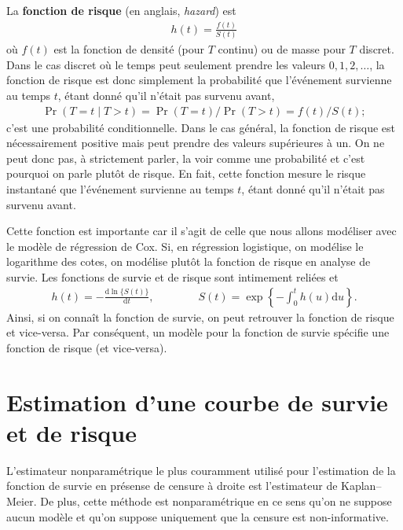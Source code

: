 \documentclass[
  11pt,
  letterpaper,
]{book}
\theoremstyle{definition}
\theoremstyle{remark}
\begin{document}
La \textbf{fonction de risque} (en anglais, \emph{hazard}) est
\begin{align*}
h(t) =  \frac{f(t)}{S(t)}
\end{align*} où \(f(t)\) est la fonction de densité (pour \(T\) continu)
ou de masse pour \(T\) discret. Dans le cas discret où le temps peut
seulement prendre les valeurs \(0, 1, 2, \ldots\), la fonction de risque
est donc simplement la probabilité que l'événement survienne au temps
\(t\), étant donné qu'il n'était pas survenu avant, \begin{align*}
\Pr(T=t \mid T > t) = \Pr(T=t) / \Pr(T >t) = f(t)/S(t);
\end{align*} c'est une probabilité conditionnelle. Dans le cas général,
la fonction de risque est nécessairement positive mais peut prendre des
valeurs supérieures à un. On ne peut donc pas, à strictement parler, la
voir comme une probabilité et c'est pourquoi on parle plutôt de risque.
En fait, cette fonction mesure le risque instantané que l'événement
survienne au temps \(t\), étant donné qu'il n'était pas survenu avant.

Cette fonction est importante car il s'agit de celle que nous allons
modéliser avec le modèle de régression de Cox. Si, en régression
logistique, on modélise le logarithme des cotes, on modélise plutôt la
fonction de risque en analyse de survie. Les fonctions de survie et de
risque sont intimement reliées et \begin{align*}
h(t) = - \frac{\mathrm{d} \ln\{S(t)\}}{\mathrm{d} t}, \qquad \qquad S(t) = \exp \left\{ -\int_0^t h(u) \mathrm{d} u\right\}.
\end{align*} Ainsi, si on connaît la fonction de survie, on peut
retrouver la fonction de risque et vice-versa. Par conséquent, un modèle
pour la fonction de survie spécifie une fonction de risque (et
vice-versa).

\hypertarget{estimation-dune-courbe-de-survie-et-de-risque}{%
\section{Estimation d'une courbe de survie et de
risque}\label{estimation-dune-courbe-de-survie-et-de-risque}}

L'estimateur nonparamétrique le plus couramment utilisé pour
l'estimation de la fonction de survie en présense de censure à droite
est l'estimateur de Kaplan--Meier. De plus, cette méthode est
nonparamétrique en ce sens qu'on ne suppose aucun modèle et qu'on
suppose uniquement que la censure est non-informative.
\end{document}
